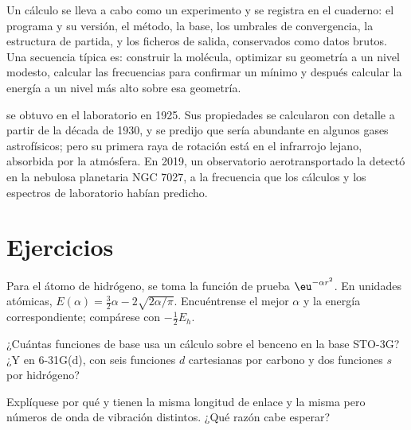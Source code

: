 \begin{inthelab}
Un cálculo se lleva a cabo como un experimento y se registra en el cuaderno: el
programa y su versión, el método, la base, los umbrales de convergencia,
la estructura de partida, y los ficheros de salida, conservados como datos brutos. Una secuencia
típica es: construir la molécula, optimizar su geometría a un nivel modesto,
calcular las frecuencias para confirmar un mínimo y después calcular la energía a un
nivel más alto sobre esa geometría.
\end{inthelab}

\begin{history}
 se obtuvo en el laboratorio en 1925. Sus propiedades se calcularon
con detalle a partir de la década de 1930, y se predijo que sería abundante en
algunos gases astrofísicos; pero su primera raya de rotación está en el infrarrojo
lejano, absorbida por la atmósfera. En 2019, un observatorio aerotransportado
la detectó en la nebulosa planetaria NGC 7027, a la frecuencia que los cálculos
y los espectros de laboratorio habían predicho.
\end{history}

\section{Ejercicios}

\begin{exercise}[$\star$]\label{exo:b3:computational-chemistry:1}
Para el átomo de hidrógeno, se toma la función de prueba $\eu^{-\alpha r^2}$. En unidades
atómicas, $E(\alpha) = \frac32\alpha - 2\sqrt{2\alpha/\pi}$. Encuéntrense el mejor $\alpha$ y
la energía correspondiente; compárese con $-\frac12E_h$.
\end{exercise}

\begin{exercise}[$\star$]\label{exo:b3:computational-chemistry:2}
¿Cuántas funciones de base usa un cálculo sobre el benceno en la base
STO-3G? ¿Y en 6-31G(d), con seis funciones $d$ cartesianas por carbono y dos funciones $s$
por hidrógeno?
\end{exercise}

\begin{exercise}[$\star$]\label{exo:b3:computational-chemistry:3}
Explíquese por qué  y  tienen la misma longitud de enlace y la misma  pero números de onda de vibración distintos. ¿Qué razón cabe esperar?
\end{exercise}

